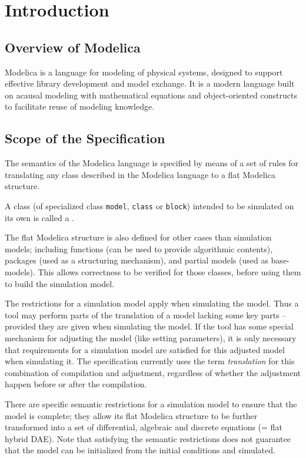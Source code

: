 \chapter{Introduction}\label{introduction1}

\section{Overview of Modelica}\label{overview-of-modelica}

Modelica is a language for modeling of physical systems, designed to
support effective library development and model exchange. It is a modern
language built on acausal modeling with mathematical equations and
object-oriented constructs to facilitate reuse of modeling knowledge.

\section{Scope of the Specification}\label{scope-of-the-specification}

The semantics of the Modelica language is specified by means of a set of
rules for translating any class described in the Modelica language to a
flat Modelica structure.

A class (of specialized class \lstinline!model!, \lstinline!class! or \lstinline!block!) intended to be simulated on its own is called a .

The flat Modelica structure is also defined for other cases than
simulation models; including functions (can be used to provide
algorithmic contents), packages (used as a structuring mechanism), and
partial models (used as base-models). This allows correctness to be
verified for those classes, before using them to build the simulation
model.

The restrictions for a simulation model apply when simulating the model.
Thus a tool may perform parts of the translation of a model lacking some key parts -- provided they are given when simulating the model.
If the tool has some special mechanism for adjusting the model (like setting parameters), it is only necessary that requirements for a simulation model are satisfied for this adjusted model when simulating it.
The specification currently uses the term \emph{translation} for this combination of compilation and adjustment, regardless of whether the adjustment happen before or after the compilation.

There are specific semantic restrictions for a simulation model to
ensure that the model is complete; they allow its flat Modelica
structure to be further transformed into a set of differential,
algebraic and discrete equations (= flat hybrid DAE). Note that
satisfying the semantic restrictions does not guarantee that the model
can be initialized from the initial conditions and simulated.

